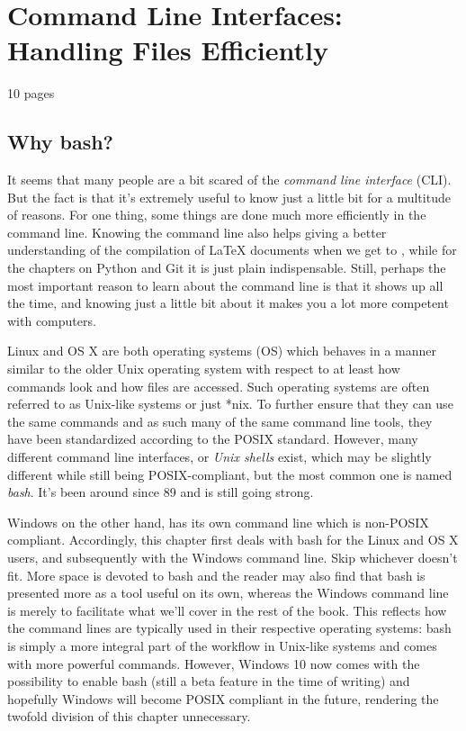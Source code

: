 \chapter{Command Line Interfaces: Handling Files Efficiently}\label{ch:bash}
10 pages
\section{Why bash?}
It seems that many people are a bit scared of the \emph{command line interface} (CLI). But the fact is that it's extremely useful to know just a little bit for a multitude of reasons. For one thing, some things are done much more efficiently in the command line. Knowing the command line also helps giving a better understanding of the compilation of \LaTeX{} documents when we get to , while for the chapters on Python and Git it is just plain indispensable. Still, perhaps the most important reason to learn about the command line is that it shows up all the time, and knowing just a little bit about it makes you a lot more competent with computers.

Linux and OS X are both operating systems (OS) which behaves in a manner similar to the older Unix operating system with respect to at least how commands look and how files are accessed. Such operating systems are often referred to as Unix-like systems or just *nix. To further ensure that they can use the same commands and as such many of the same command line tools, they have been standardized according to the POSIX standard. However, many different command line interfaces, or \emph{Unix shells} exist, which may be slightly different while still being POSIX-compliant, but the most common one is named \emph{bash}. It's been around since 89 and is still going strong.

Windows on the other hand, has its own command line which is non-POSIX compliant. Accordingly, this chapter first deals with bash for the Linux and OS X users, and subsequently with the Windows command line. Skip whichever doesn't fit.  More space is devoted to bash and the reader may also find that bash is presented more as a tool useful on its own, whereas the Windows command line is merely to facilitate what we'll cover in the rest of the book. This reflects how the command lines are typically used in their respective operating systems: bash is simply a more integral part of the workflow in Unix-like systems and comes with more powerful commands. However, Windows 10 now comes with the possibility to enable bash (still a beta feature in the time of writing) and hopefully Windows will become POSIX compliant in the future, rendering the twofold division of this chapter unnecessary.

